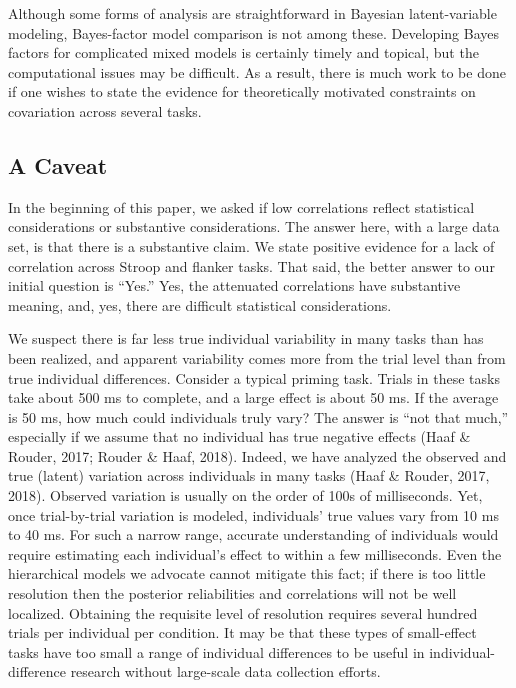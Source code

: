 \documentclass[english,man]{apa6}
\theoremstyle{definition}
\theoremstyle{definition}
\theoremstyle{remark}
\begin{document}
Although some forms of analysis are straightforward in Bayesian
latent-variable modeling, Bayes-factor model comparison is not among
these. Developing Bayes factors for complicated mixed models is
certainly timely and topical, but the computational issues may be
difficult. As a result, there is much work to be done if one wishes to
state the evidence for theoretically motivated constraints on
covariation across several tasks.

\subsection{A Caveat}\label{a-caveat}

In the beginning of this paper, we asked if low correlations reflect
statistical considerations or substantive considerations. The answer
here, with a large data set, is that there is a substantive claim. We
state positive evidence for a lack of correlation across Stroop and
flanker tasks. That said, the better answer to our initial question is
\enquote{Yes.} Yes, the attenuated correlations have substantive
meaning, and, yes, there are difficult statistical considerations.

We suspect there is far less true individual variability in many tasks
than has been realized, and apparent variability comes more from the
trial level than from true individual differences. Consider a typical
priming task. Trials in these tasks take about 500 ms to complete, and a
large effect is about 50 ms. If the average is 50 ms, how much could
individuals truly vary? The answer is \enquote{not that much,}
especially if we assume that no individual has true negative effects
(Haaf \& Rouder, 2017; Rouder \& Haaf, 2018). Indeed, we have analyzed
the observed and true (latent) variation across individuals in many
tasks (Haaf \& Rouder, 2017, 2018). Observed variation is usually on the
order of 100s of milliseconds. Yet, once trial-by-trial variation is
modeled, individuals' true values vary from 10 ms to 40 ms. For such a
narrow range, accurate understanding of individuals would require
estimating each individual's effect to within a few milliseconds. Even
the hierarchical models we advocate cannot mitigate this fact; if there
is too little resolution then the posterior reliabilities and
correlations will not be well localized. Obtaining the requisite level
of resolution requires several hundred trials per individual per
condition. It may be that these types of small-effect tasks have too
small a range of individual differences to be useful in
individual-difference research without large-scale data collection
efforts.
\end{document}
